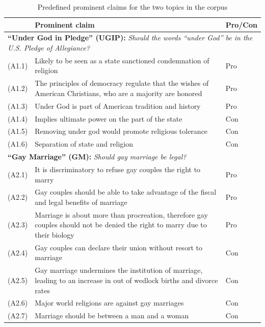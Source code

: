 \begin{table}[t]
\centering
{\small
\begin{tabular}{lp{12cm}l}
\toprule
& Prominent claim & Pro/Con\\
\midrule
\multicolumn{3}{p{13cm}}{\textbf{``Under God in Pledge'' (UGIP):} \emph{Should
the words ``under God'' be in the U.S. Pledge of Allegiance? }}\\
(A1.1) & \normalsize{Likely to be seen as a state sanctioned condemnation of religion}  &  Pro \\
(A1.2) & \normalsize{The principles of democracy regulate that the wishes of American Christians,
     who are a majority are honored} & Pro \\
(A1.3) & \normalsize{Under God is part of American tradition and history} & Pro  \\  
(A1.4) & \normalsize{Implies ultimate power on the part of the state} &   Con \\  
(A1.5) & \normalsize{Removing under god would promote religious tolerance} & Con \\  
(A1.6) & \normalsize{Separation of state and religion} & Con \\
\midrule
\multicolumn{3}{l}{\textbf{``Gay Marriage'' (GM):} \emph{Should gay marriage be legal?}}\\
(A2.1) & \normalsize{It is discriminatory to refuse gay couples the right to marry} & Pro \\
(A2.2) & \normalsize{Gay couples should be able to take advantage of the fiscal and legal
benefits of marriage} & Pro \\
(A2.3) & \normalsize{Marriage is about more than procreation, therefore gay couples should not 
be denied the right to marry due to their biology} & Pro\\
(A2.4) & \normalsize{Gay couples can declare their union without resort to marriage} & Con \\
(A2.5) & \normalsize{Gay marriage undermines the institution of marriage, leading to an increase
in out of wedlock births and divorce rates} & Con \\
(A2.6) & \normalsize{Major world religions are against gay marriages} & Con \\
(A2.7) & \normalsize{Marriage should be between a man and a woman} & Con \\
\bottomrule
\end{tabular}
}
\caption{Predefined prominent claims for the two topics in the \ComArg corpus}
\label{tab:comarg-claims}
\end{table}


